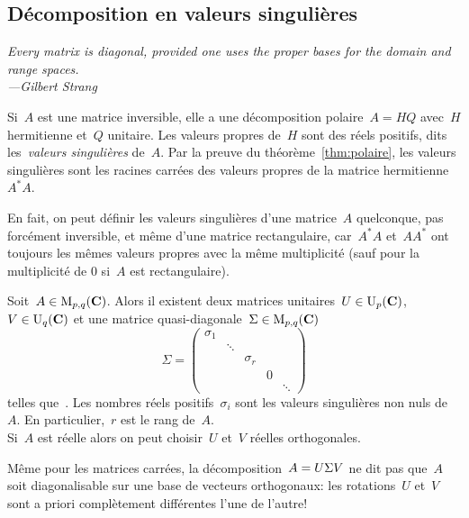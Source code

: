 \subsection{Décomposition en valeurs singulières}

\emph{\small Every matrix is diagonal, provided one uses the proper bases for
the domain and range spaces.\\ \hfill---Gilbert Strang}

Si~$A$ est une matrice inversible, elle a une décomposition
polaire~$A=HQ$ avec~$H$ hermitienne et~$Q$ unitaire.  Les valeurs propres
de~$H$ sont des réels positifs, dits les~\emph{valeurs singulières} de~$A$.
Par la preuve du théorème~\ref{thm:polaire}, les valeurs singulières sont les
racines carrées des valeurs propres de la matrice hermitienne~$A^*A$.

En fait, on peut définir les valeurs singulières d'une matrice~$A$
quelconque, pas forcément inversible, et même d'une matrice rectangulaire,
car~$A^*A$ et~$AA^*$ ont toujours les mêmes valeurs propres avec la même
multiplicité (sauf pour la multiplicité de $0$ si~$A$ est rectangulaire).

\begin{theorem}
	\label{thm:svd}
	Soit~$A\in\mathrm{M}_{p,q}(\mathbf{C})$.  Alors il existent deux matrices unitaires~$U\in
	\mathrm{U}_p(\mathbf{C})$, $V\in\mathrm{U}_q(\mathbf{C})$ et une matrice quasi-diagonale~$\Sigma\in
	\mathrm{M}_{p,q}(\mathbf{C})$
	\[
		\Sigma = \begin{pmatrix}
			\sigma_1 & & & & \\
			 & \ddots & & & \\
			 & & \sigma_r & & \\
			 & & & 0 & \\
			 & & & & \ddots
		\end{pmatrix}
	\]
	telles que~.  Les nombres réels
	positifs~$\sigma_i$ sont les valeurs singulières non nuls de~$A$.  En
	particulier,~$r$ est le rang de~$A$. \\
	Si~$A$ est réelle alors on peut choisir~$U$ et~$V$ réelles orthogonales.
\end{theorem}

\begin{remark}
	Même pour les matrices carrées, la décomposition~$A=U\/\Sigma V$ ne dit pas
	que~$A$ soit diagonalisable sur une base de vecteurs orthogonaux: les
	rotations~$U$ et~$V$ sont a priori complètement différentes l'une de l'autre!
\end{remark}

